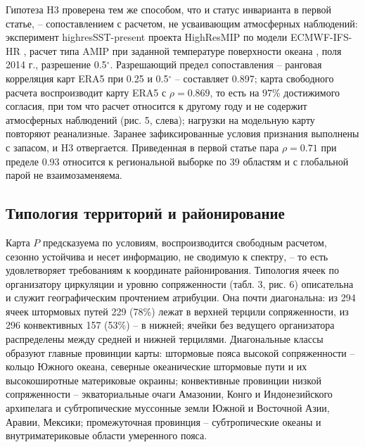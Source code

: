 \documentclass[12pt,a4paper]{article}
\begin{document}
Гипотеза H3 проверена тем же способом, что и статус инварианта в первой статье, -- сопоставлением с расчетом, не усваивающим атмосферных наблюдений: эксперимент highresSST-present проекта HighResMIP \cite{Haarsma2016} по модели ECMWF-IFS-HR \cite{Roberts2018}, расчет типа AMIP при заданной температуре поверхности океана \cite{Gates1992}, поля 2014 г., разрешение 0.5$^\circ$. Разрешающий предел сопоставления -- ранговая корреляция карт ERA5 при 0.25 и 0.5$^\circ$ -- составляет 0.897; карта свободного расчета воспроизводит карту ERA5 с $\rho = 0.869$, то есть на 97\% достижимого согласия, при том что расчет относится к другому году и не содержит атмосферных наблюдений (рис. 5, слева); нагрузки на модельную карту повторяют реанализные. Заранее зафиксированные условия признания выполнены с запасом, и H3 отвергается. Приведенная в первой статье пара $\rho = 0.71$ при пределе 0.93 относится к региональной выборке по 39 областям и с глобальной парой не взаимозаменяема.

\subsection{Типология территорий и районирование}

Карта $P$ предсказуема по условиям, воспроизводится свободным расчетом, сезонно устойчива и несет информацию, не сводимую к спектру, -- то есть удовлетворяет требованиям к координате районирования. Типология ячеек по организатору циркуляции и уровню сопряженности (табл. 3, рис. 6) описательна и служит географическим прочтением атрибуции. Она почти диагональна: из 294 ячеек штормовых путей 229 (78\%) лежат в верхней терцили сопряженности, из 296 конвективных 157 (53\%) -- в нижней; ячейки без ведущего организатора распределены между средней и нижней терцилями. Диагональные классы образуют главные провинции карты: штормовые пояса высокой сопряженности -- кольцо Южного океана, северные океанические штормовые пути и их высокоширотные материковые окраины; конвективные провинции низкой сопряженности -- экваториальные очаги Амазонии, Конго и Индонезийского архипелага и субтропические муссонные земли Южной и Восточной Азии, Аравии, Мексики; промежуточная провинция -- субтропические океаны и внутриматериковые области умеренного пояса.
\end{document}
